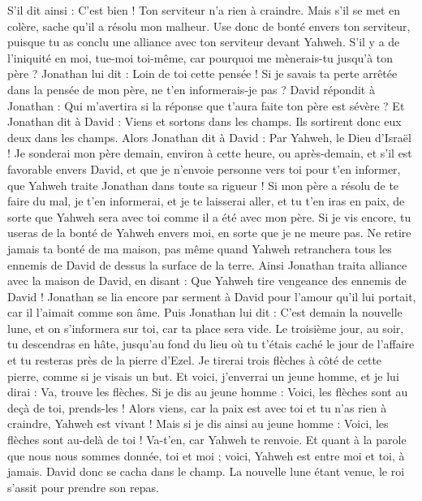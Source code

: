 \begin{multicols}{2}
S'il dit ainsi : C'est bien ! Ton serviteur n'a rien à craindre. Mais s'il se met en colère, sache qu'il a résolu mon malheur.
Use donc de bonté envers ton serviteur, puisque tu as conclu une alliance avec ton serviteur devant Yahweh. S'il y a de l'iniquité en moi, tue-moi toi-même, car pourquoi me mènerais-tu jusqu'à ton père ?
Jonathan lui dit : Loin de toi cette pensée ! Si je savais ta perte arrêtée dans la pensée de mon père, ne t'en informerais-je pas ?
David répondit à Jonathan : Qui m'avertira si la réponse que t'aura faite ton père est sévère ?
Et Jonathan dit à David : Viens et sortons dans les champs. Ils sortirent donc eux deux dans les champs.
Alors Jonathan dit à David : Par Yahweh, le Dieu d'Israël ! Je sonderai mon père demain, environ à cette heure, ou après-demain, et s'il est favorable envers David, et que je n'envoie personne vers toi pour t'en informer,
que Yahweh traite Jonathan dans toute sa rigueur ! Si mon père a résolu de te faire du mal, je t'en informerai, et je te laisserai aller, et tu t'en iras en paix, de sorte que Yahweh sera avec toi comme il a été avec mon père.
Si je vis encore, tu useras de la bonté de Yahweh envers moi, en sorte que je ne meure pas.
Ne retire jamais ta bonté de ma maison, pas même quand Yahweh retranchera tous les ennemis de David de dessus la surface de la terre.
Ainsi Jonathan traita alliance avec la maison de David, en disant : Que Yahweh tire vengeance des ennemis de David !
Jonathan se lia encore par serment à David pour l'amour qu'il lui portait, car il l'aimait comme son âme.
Puis Jonathan lui dit : C'est demain la nouvelle lune, et on s'informera sur toi, car ta place sera vide.
Le troisième jour, au soir, tu descendras en hâte, jusqu'au fond du lieu où tu t'étais caché le jour de l'affaire et tu resteras près de la pierre d'Ezel.
Je tirerai trois flèches à côté de cette pierre, comme si je visais un but.
Et voici, j'enverrai un jeune homme, et je lui dirai : Va, trouve les flèches. Si je dis au jeune homme : Voici, les flèches sont au deçà de toi, prends-les ! Alors viens, car la paix est avec toi et tu n'as rien à craindre, Yahweh est vivant !
Mais si je dis ainsi au jeune homme : Voici, les flèches sont au-delà de toi ! Va-t'en, car Yahweh te renvoie.
Et quant à la parole que nous nous sommes donnée, toi et moi ; voici, Yahweh est entre moi et toi, à jamais.
David donc se cacha dans le champ. La nouvelle lune étant venue, le roi s'assit pour prendre son repas.

\end{multicols}
